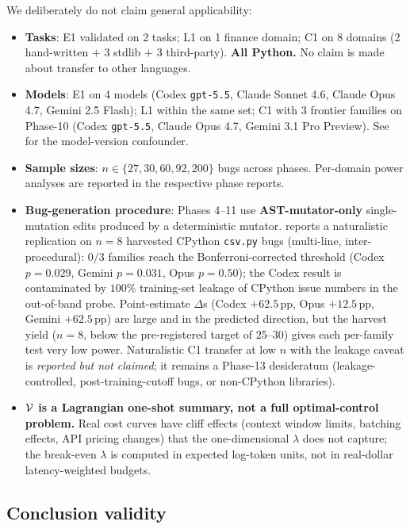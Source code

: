 We deliberately do not claim general applicability:
\begin{itemize}[leftmargin=2em]
\item \textbf{Tasks}: E1 validated on 2 tasks; L1 on 1 finance domain; C1 on 8 domains (2 hand-written $+$ 3 stdlib $+$ 3 third-party). \textbf{All Python.} No claim is made about transfer to other languages.
\item \textbf{Models}: E1 on 4 models (Codex \texttt{gpt-5.5}, Claude Sonnet 4.6, Claude Opus 4.7, Gemini 2.5 Flash); L1 within the same set; C1 with $3$ frontier families on Phase-10 (Codex \texttt{gpt-5.5}, Claude Opus 4.7, Gemini 3.1 Pro Preview). See  for the model-version confounder.
\item \textbf{Sample sizes}: $n \in \{27, 30, 60, 92, 200\}$ bugs across phases. Per-domain power analyses are reported in the respective phase reports.
\item \textbf{Bug-generation procedure}: Phases 4--11 use \textbf{AST-mutator-only} single-mutation edits produced by a deterministic mutator.  reports a naturalistic replication on $n = 8$ harvested CPython \texttt{csv.py} bugs (multi-line, inter-procedural): $0/3$ families reach the Bonferroni-corrected threshold (Codex $p = 0.029$, Gemini $p = 0.031$, Opus $p = 0.50$); the Codex result is contaminated by $100\%$ training-set leakage of CPython issue numbers in the out-of-band probe. Point-estimate $\Delta$s (Codex $+62.5\,\mathrm{pp}$, Opus $+12.5\,\mathrm{pp}$, Gemini $+62.5\,\mathrm{pp}$) are large and in the predicted direction, but the harvest yield ($n = 8$, below the pre-registered target of $25$--$30$) gives each per-family test very low power. Naturalistic C1 transfer at low $n$ with the leakage caveat is \emph{reported but not claimed}; it remains a Phase-13 desideratum (leakage-controlled, post-training-cutoff bugs, or non-CPython libraries).
\item \textbf{$\mathcal{V}$ is a Lagrangian one-shot summary, not a full optimal-control problem.} Real cost curves have cliff effects (context window limits, batching effects, API pricing changes) that the one-dimensional $\lambda$ does not capture; the break-even $\lambda$ is computed in expected log-token units, not in real-dollar latency-weighted budgets.
\end{itemize}

\subsection{Conclusion validity}
\label{sec:conclusion-validity}
\label{sec:cross-phase-confounder}

